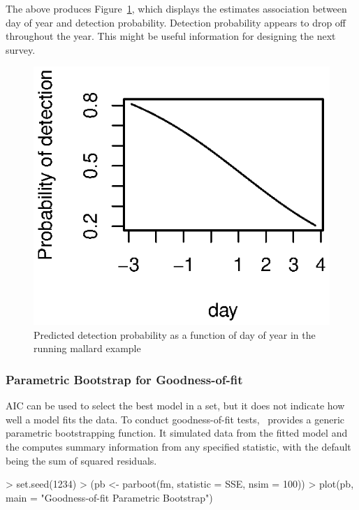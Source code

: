 \documentclass[article,shortnames]{jss}
\newcommand{\um}{\pkg{unmarked}}
\begin{document}
The above produces Figure~\ref{fig:preddet}, which displays the
estimates association between day of year and detection probability.
Detection probability appears to drop off throughout the year.
This might be useful information for designing the next survey.

\begin{figure}
  \centering
\includegraphics{unmarked-025}
\caption{Predicted detection probability as a function of day of year
  in the running mallard example}
\label{fig:preddet}
\end{figure}

\subsubsection{Parametric Bootstrap for Goodness-of-fit}

AIC can be used to select the best model in a set, but it does not indicate
how well a model fits the data.  
To conduct goodness-of-fit tests, \um\ provides a generic
parametric bootstrapping function.  It simulated data from the fitted
model and the computes summary information from any specified
statistic, with the default being the sum of squared residuals.


\begin{Schunk}
\begin{Sinput}
> set.seed(1234)
> (pb <- parboot(fm, statistic = SSE, nsim = 100))
> plot(pb, main = "Goodness-of-fit Parametric Bootstrap")
\end{Sinput}
\end{Schunk}
\end{document}
